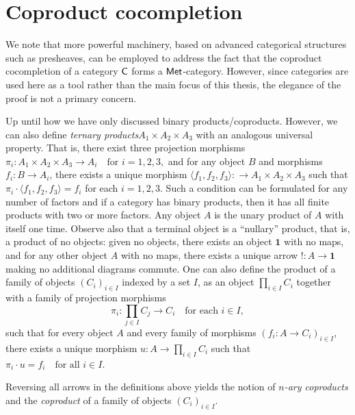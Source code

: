 \section{Coproduct cocompletion}



We note that more powerful machinery, based on advanced categorical structures such as presheaves, can be employed to address the fact that the coproduct cocompletion of a category $\mathsf{C}$ forms a $\mathsf{Met}$-category. However, since categories are used here as a tool rather than the main focus of this thesis, the elegance of the proof is not a primary concern.


Up until how we have only discussed binary products/coproducts. However, we can also define \emph{ternary products}\(A_1 \times A_2 \times A_3\) with an analogous universal property. That is, there exist three projection morphisms
$\pi_i : A_1 \times A_2 \times A_3 \to A_i \quad \text{for } i = 1, 2, 3,$
and for any object \(B\) and morphisms \(f_i : B \to A_i\), there exists a unique morphism $\langle f_1, f_2, f_3 \rangle  : \to A_1 \times A_2 \times A_3$ such that \(\pi_i \cdot \langle f_1, f_2, f_3 \rangle = f_i\) for each \(i = 1, 2, 3\). Such a condition can be formulated for any number of factors and if a category has binary products, then it has all finite products with two or more factors. Any object $A$ is the unary product of $A$ with itself one time. Observe also that a terminal object is a ``nullary'' product, that is, a product of no objects: given no objects, there exists an object $\mathbf{1}$ with no maps, and for any other object $A$ with no maps, there exists a unique arrow $!: A \to \mathbf{1}$ making no additional diagrams commute. One can also define the product of a family of objects \((C_i)_{i \in I}\) indexed by a set \(I\), as an object $\prod_{i \in I} C_i$
together with a family of projection morphisms
\[
\pi_i : \prod_{j \in I} C_j \to C_i \quad \text{for each } i \in I,
\]
such that for every object \(A\) and every family of morphisms \((f_i : A \to C_i)_{i \in I}\), there exists a unique morphism $u : A \to \prod_{i \in I} C_i$ such that $\pi_i \cdot u = f_i \quad \text{for all } i \in I$.
 
Reversing all arrows in the definitions above yields the notion of \emph{$n$-ary coproducts} and the \emph{coproduct} of a family of objects $(C_i)_{i \in I}$.

